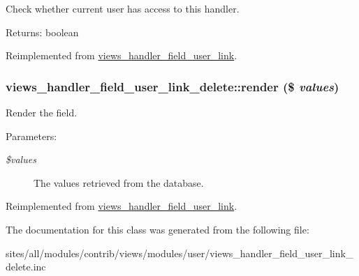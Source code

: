 Check whether current user has access to this handler.

\begin{Desc}
\item[Returns:]boolean \end{Desc}


Reimplemented from \hyperlink{classviews__handler__field__user__link_00708207b597556c70cba91816a03963}{views\_\-handler\_\-field\_\-user\_\-link}.\hypertarget{classviews__handler__field__user__link__delete_8f298b2f0f6edd91efb2c38e6bec03d9}{
\subsubsection[{render}]{\setlength{\rightskip}{0pt plus 5cm}views\_\-handler\_\-field\_\-user\_\-link\_\-delete::render (\$ {\em values})}}
\label{classviews__handler__field__user__link__delete_8f298b2f0f6edd91efb2c38e6bec03d9}


Render the field.

\begin{Desc}
\item[Parameters:]
\begin{description}
\item[{\em \$values}]The values retrieved from the database. \end{description}
\end{Desc}


Reimplemented from \hyperlink{classviews__handler__field__user__link_f81b37cfa8e0c2363ad8ed9bb601cd14}{views\_\-handler\_\-field\_\-user\_\-link}.

The documentation for this class was generated from the following file:\begin{CompactItemize}
\item 
sites/all/modules/contrib/views/modules/user/views\_\-handler\_\-field\_\-user\_\-link\_\-delete.inc\end{CompactItemize}
